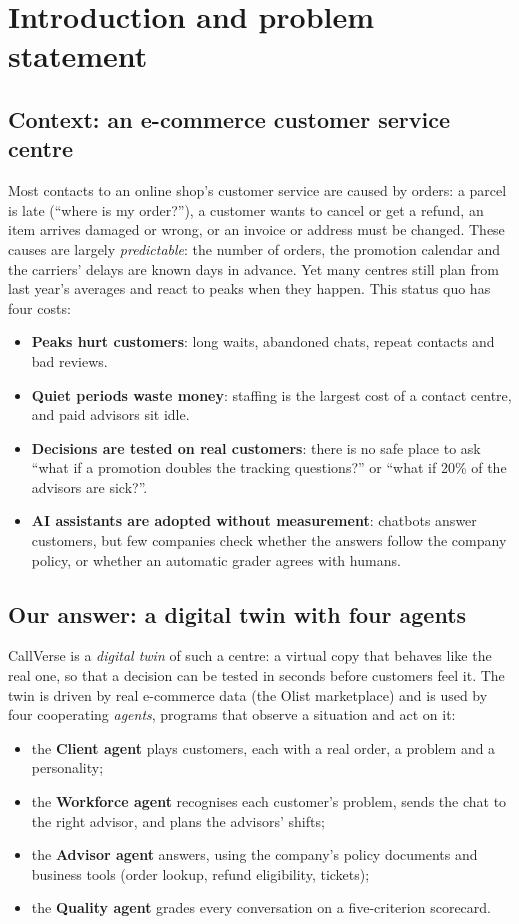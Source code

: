\section{Introduction and problem statement}
\label{sec:intro}

\subsection{Context: an e-commerce customer service centre}
Most contacts to an online shop's customer service are caused by orders: a parcel is late (``where is my
order?''), a customer wants to cancel or get a refund, an item arrives damaged or wrong, or an invoice or
address must be changed. These causes are largely \emph{predictable}: the number of orders, the promotion
calendar and the carriers' delays are known days in advance. Yet many centres still plan from last year's
averages and react to peaks when they happen. This status quo has four costs:
\begin{itemize}
  \item \textbf{Peaks hurt customers}: long waits, abandoned chats, repeat contacts and bad reviews.
  \item \textbf{Quiet periods waste money}: staffing is the largest cost of a contact centre, and paid advisors
        sit idle.
  \item \textbf{Decisions are tested on real customers}: there is no safe place to ask ``what if a promotion
        doubles the tracking questions?'' or ``what if 20\% of the advisors are sick?''.
  \item \textbf{AI assistants are adopted without measurement}: chatbots answer customers, but few companies
        check whether the answers follow the company policy, or whether an automatic grader agrees with humans.
\end{itemize}

\subsection{Our answer: a digital twin with four agents}
CallVerse is a \emph{digital twin} of such a centre: a virtual copy that behaves like the real one, so that
a decision can be tested in seconds before customers feel it. The twin is driven by real e-commerce data
(the Olist marketplace) and is used by four cooperating \emph{agents}, programs that observe a situation and
act on it:
\begin{itemize}
  \item the \textbf{Client agent} plays customers, each with a real order, a problem and a personality;
  \item the \textbf{Workforce agent} recognises each customer's problem, sends the chat to the right advisor,
        and plans the advisors' shifts;
  \item the \textbf{Advisor agent} answers, using the company's policy documents and business tools (order
        lookup, refund eligibility, tickets);
  \item the \textbf{Quality agent} grades every conversation on a five-criterion scorecard.
\end{itemize}

